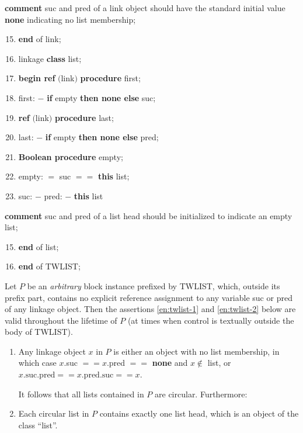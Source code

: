 \parindent\quad \quad \quad \textbf{comment} suc and pred of a link object should have the standard initial value \textbf{none} indicating no list membership;

\begin{enumerate}[nosep, label=\arabic*.]
	\setcounter{enumi}{14}
	\item \quad \textbf{end} of link;
	\item \quad linkage \textbf{class} list;
	\item \quad \textbf{begin ref} $($link$)$ \textbf{procedure} first;
	\item \quad \quad \quad first: $-$ \textbf{if} empty \textbf{then none else} suc;
	\item \quad \quad \textbf{ref} $($link$)$ \textbf{procedure} last;
	\item \quad \quad \quad last: $-$ \textbf{if} empty \textbf{then none else} pred;
	\item \quad \quad \textbf{Boolean procedure} empty;
	\item \quad \quad \quad empty: $=$ suc $==$ \textbf{this} list;
	\item \quad \quad \quad suc: $-$ pred: $-$ \textbf{this} list
\end{enumerate}

\parindent\quad \quad \quad \quad \textbf{comment} suc and pred of a list head should be initialized to indicate an empty list;

\begin{enumerate}[nosep, label=\arabic*.]
	\setcounter{enumi}{14}

	\item \quad \textbf{end} of list;
	\item \textbf{end} of TWLIST;
\end{enumerate}

Let $P$ be an \textit{arbitrary} block instance prefixed by TWLIST, which, outside its prefix part, contains no explicit reference assignment to any variable suc or pred of any linkage object. Then the assertions \ref{en:twlist-1} and \ref{en:twlist-2} below are valid throughout the lifetime of $P$ (at times when control is textually outside the body of TWLIST).

\begin{enumerate}[wide, nosep, label=(\arabic*)]
	\item \label{en:twlist-1}
	Any linkage object $x$ in $P$ is either an object with no list membership, in which case $x$.suc $== x$.pred $==$ \textbf{none} and $x \notin$ list, or $x\text{.suc.pred} == x\text{.pred.suc} == x$. 
	
	It follows that all lists contained in $P$ are circular. Furthermore:
	
	\item \label{en:twlist-2}
	Each circular list in $P$ contains exactly one list head, which is an object of the class ``list''.
\end{enumerate}

